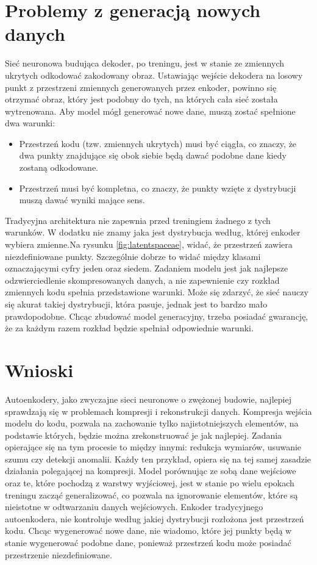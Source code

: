 \documentclass[a4paper,12pt,oneside]{book} %
\begin{document}
\section{Problemy z generacją nowych danych}
 Sieć neuronowa budująca dekoder, po treningu, jest w stanie ze zmiennych ukrytych odkodować zakodowany obraz. Ustawiając wejście dekodera na losowy punkt z przestrzeni zmiennych generowanych przez enkoder, powinno się otrzymać obraz, który jest podobny do tych, na których cała sieć została wytrenowana.
Aby model mógł generować nowe dane, muszą zostać spełnione dwa warunki:
\begin{itemize}
	\item Przestrzeń kodu (tzw. zmiennych ukrytych) musi być ciągła, co znaczy, że dwa punkty znajdujące się obok siebie będą dawać podobne dane kiedy zostaną odkodowane.
	\item Przestrzeń musi być kompletna, co znaczy, że punkty wzięte z dystrybucji muszą dawać wyniki mające sens.
\end{itemize}
Tradycyjna architektura nie zapewnia przed treningiem żadnego z tych warunków. W dodatku nie znamy jaka jest dystrybucja według, której enkoder wybiera zmienne.Na rysunku \ref{fig:latentspaceae}, widać, że przestrzeń zawiera niezdefiniowane punkty. Szczególnie dobrze to widać między klasami oznaczającymi cyfry jeden oraz siedem. Zadaniem modelu jest jak najlepsze odzwierciedlenie skompresowanych danych, a nie zapewnienie czy rozkład zmiennych kodu spełnia przedstawione warunki. Może się zdarzyć, że sieć nauczy się akurat takiej dystrybucji, która pasuje, jednak jest to bardzo mało prawdopodobne. Chcąc zbudować model generacyjny, trzeba posiadać gwarancję, że za każdym razem rozkład będzie spełniał odpowiednie warunki.
\section{Wnioski}
Autoenkodery, jako zwyczajne sieci neuronowe o zwężonej budowie, najlepiej sprawdzają się w problemach kompresji i rekonstrukcji danych. Kompresja wejścia modelu do kodu, pozwala na zachowanie tylko najistotniejszych elementów, na podstawie których, będzie można zrekonstruować je jak najlepiej. Zadania opierające się na tym procesie to między innymi: redukcja wymiarów, usuwanie szumu czy detekcji anomalii. Każdy ten przykład, opiera się na tej samej zasadzie działania polegającej na kompresji. Model porównując ze sobą dane wejściowe oraz te, które pochodzą z warstwy wyjściowej, jest w stanie po wielu epokach treningu zacząć generalizować, co pozwala na ignorowanie elementów, które są nieistotne w odtwarzaniu danych wejściowych. Enkoder tradycyjnego autoenkodera, nie kontroluje według jakiej dystrybucji rozłożona jest przestrzeń kodu. Chcąc wygenerować nowe dane, nie wiadomo, które jej punkty będą w stanie wygenerować podobne dane, ponieważ przestrzeń kodu może posiadać przestrzenie niezdefiniowane.
 
\end{document}
